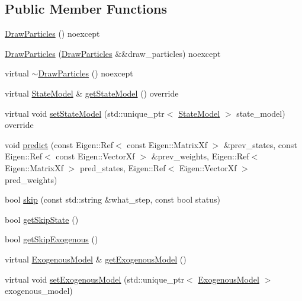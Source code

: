 \subsection*{Public Member Functions}
\begin{DoxyCompactItemize}
\item 
\mbox{\hyperlink{classbfl_1_1DrawParticles_acd7269927dc19bf3f34f7a65934c1e2c}{Draw\+Particles}} () noexcept
\item 
\mbox{\hyperlink{classbfl_1_1DrawParticles_aa5ef8dc20a4c5fac0f30531fbe5a1ecd}{Draw\+Particles}} (\mbox{\hyperlink{classbfl_1_1DrawParticles}{Draw\+Particles}} \&\&draw\+\_\+particles) noexcept
\item 
virtual \mbox{\hyperlink{classbfl_1_1DrawParticles_a7acfdc073d85f1425c2d8d9ba1339896}{$\sim$\+Draw\+Particles}} () noexcept
\item 
virtual \mbox{\hyperlink{classbfl_1_1StateModel}{State\+Model}} \& \mbox{\hyperlink{classbfl_1_1DrawParticles_a7a7ebf5a7ea10747db1bd8ab03390107}{get\+State\+Model}} () override
\item 
virtual void \mbox{\hyperlink{classbfl_1_1DrawParticles_acb607ab90c22a43a72a75576acb898a4}{set\+State\+Model}} (std\+::unique\+\_\+ptr$<$ \mbox{\hyperlink{classbfl_1_1StateModel}{State\+Model}} $>$ state\+\_\+model) override
\item 
void \mbox{\hyperlink{classbfl_1_1PFPrediction_a54986f12509d3d997232c4e926420c90}{predict}} (const Eigen\+::\+Ref$<$ const Eigen\+::\+Matrix\+Xf $>$ \&prev\+\_\+states, const Eigen\+::\+Ref$<$ const Eigen\+::\+Vector\+Xf $>$ \&prev\+\_\+weights, Eigen\+::\+Ref$<$ Eigen\+::\+Matrix\+Xf $>$ pred\+\_\+states, Eigen\+::\+Ref$<$ Eigen\+::\+Vector\+Xf $>$ pred\+\_\+weights)
\item 
bool \mbox{\hyperlink{classbfl_1_1PFPrediction_a364cc35a151e5298c4024d681f3e04d9}{skip}} (const std\+::string \&what\+\_\+step, const bool status)
\item 
bool \mbox{\hyperlink{classbfl_1_1PFPrediction_a323ca5612dd7ad924fd448a629359ad2}{get\+Skip\+State}} ()
\item 
bool \mbox{\hyperlink{classbfl_1_1PFPrediction_a432b8e84dbf00432158aa82312386d63}{get\+Skip\+Exogenous}} ()
\item 
virtual \mbox{\hyperlink{classbfl_1_1ExogenousModel}{Exogenous\+Model}} \& \mbox{\hyperlink{classbfl_1_1PFPrediction_aefa127a440649447e8ac659ef65b7a2a}{get\+Exogenous\+Model}} ()
\item 
virtual void \mbox{\hyperlink{classbfl_1_1PFPrediction_ada843698204584e97d4ff6728c8e8264}{set\+Exogenous\+Model}} (std\+::unique\+\_\+ptr$<$ \mbox{\hyperlink{classbfl_1_1ExogenousModel}{Exogenous\+Model}} $>$ exogenous\+\_\+model)
\end{DoxyCompactItemize}
